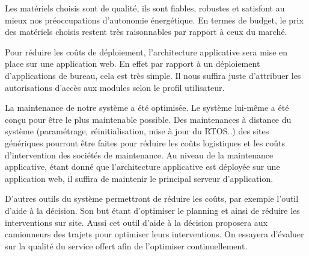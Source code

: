 \par Les matériels choisis sont de qualité, ils sont fiables, robustes et satisfont au mieux nos préoccupations d’autonomie énergétique. En termes de budget, le prix des matériels choisis restent très raisonnables par rapport à ceux du marché.

\par Pour réduire les coûts de déploiement, l’architecture applicative sera mise en place sur une application web. En effet par rapport à un déploiement d’applications de bureau, cela est très simple. Il nous suffira juste d’attribuer les autorisations d’accès aux modules selon le profil utilisateur.

\par La maintenance de notre système a été optimisée. Le système lui-même a été conçu pour être le plus maintenable possible. Des maintenances à distance du système (paramétrage, réinitialisation, mise à jour du RTOS..) des sites génériques pourront être faites pour réduire les coûts logistiques et les coûts d’intervention des sociétés de maintenance. Au niveau de la maintenance applicative, étant donné que l’architecture applicative est déployée sur une application web, il suffira de maintenir le principal serveur d’application.

\par D’autres outils du système permettront de réduire les coûts, par exemple l’outil d’aide à la décision. Son but étant d’optimiser le planning et ainsi de réduire les interventions sur site. Aussi cet outil d’aide à la décision proposera aux camionneurs des trajets pour optimiser leurs interventions. On essayera d’évaluer sur la qualité du service offert afin de l’optimiser continuellement.



